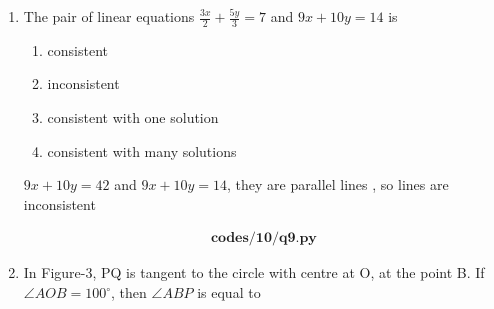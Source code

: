 \begin{enumerate}[label=\thesubsection.\arabic*, ref=\thesubsection.\theenumi]
\begin{enumerate}
	\end{enumerate}	
	\solution
	
	
	centre $\implies $midpoint of end points of diameter  
	
	centre $O(x,y)= (\frac{x_1+x_2}{2},\frac{y_1+y_2}{2}) \implies O(x,y)= (0,\frac{7}{2})$
	
	\item 
	The pair of linear equations $\frac{3x}{2} + \frac{5y}{3} = 7$ and $9x + 10y = 14$ is   
	\begin{enumerate}
		
		\item consistent
		
		\item inconsistent   
		
		\item  consistent with one solution 
		
		\item  consistent with many solutions
		
	\end{enumerate}	
	\solution
	
	
	$9x+10y= 42 $ and $9x+10y=14$, they are parallel lines , so lines are inconsistent 
	
	\begin{align}
		\textbf{codes/10/q9.py}
	\end{align}
	\item In Figure-3, PQ is tangent to the circle with centre at O, at the point B. If $\angle AOB = 100^{\circ}$, then $\angle ABP$ is equal to   
	\begin{enumerate}
	\end{enumerate}	
	

\end{enumerate}
